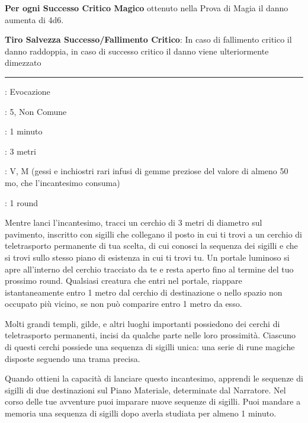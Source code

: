 \begin{multicols}{2}
\textbf{Per ogni Successo Critico Magico} ottenuto nella Prova di Magia il danno aumenta di 4d6.

\textbf{Tiro Salvezza Successo/Fallimento Critico}: In caso di fallimento critico il danno raddoppia, in caso di successo critico il danno viene ulteriormente dimezzato

\smallskip\noindent\rule{\linewidth}{2pt} \hypertarget{Cerchio di Teletrasporto}{}\medskip{}
\noindent
\begin{description}[noitemsep, topsep=0pt, parsep=0pt, partopsep=0pt, leftmargin=0cm, labelwidth=2.8cm]
	\item[\textbf{Lista di Magia}]: Evocazione
	\item[\textbf{Livello}]: 5, Non Comune
	\item[\textbf{T. di Lancio}]: 1 minuto
	\item[\textbf{Gittata}]: 3 metri
	\item[\textbf{Componenti}]: V, M (gessi e inchiostri rari infusi di gemme preziose del valore di almeno 50 mo, che l'incantesimo consuma)
	\item[\textbf{Durata}]: 1 round
\end{description}

Mentre lanci l'incantesimo, tracci un cerchio di 3 metri di diametro sul pavimento, inscritto con sigilli che collegano il posto in cui ti trovi a un cerchio di teletrasporto permanente di tua scelta, di cui conosci la sequenza dei sigilli e che si trovi sullo stesso piano di esistenza in cui ti trovi tu. Un portale luminoso si apre all'interno del cerchio tracciato da te e resta aperto fino al termine del tuo prossimo round. Qualsiasi creatura che entri nel portale, riappare istantaneamente entro 1 metro dal cerchio di destinazione o nello spazio non occupato più vicino, se non può comparire entro 1 metro da esso.

Molti grandi templi, gilde, e altri luoghi importanti possiedono dei cerchi di teletrasporto permanenti, incisi da qualche parte nelle loro prossimità. Ciascuno di questi cerchi possiede una sequenza di sigilli unica: una serie di rune magiche disposte seguendo una trama precisa.

Quando ottieni la capacità di lanciare questo incantesimo, apprendi le sequenze di sigilli di due destinazioni sul Piano Materiale, determinate dal Narratore. Nel corso delle tue avventure puoi imparare nuove sequenze di sigilli. Puoi mandare a memoria una sequenza di sigilli dopo averla studiata per almeno 1 minuto.


\end{multicols}
